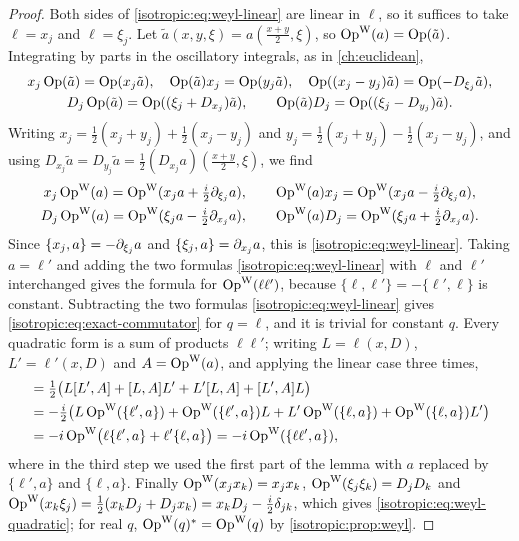 \begin{proof}
Both sides of \eqref{isotropic:eq:weyl-linear} are linear in $\ell$, so it
suffices to take $\ell=x_j$ and $\ell=\xi_j$. Let $\tilde a(x,y,\xi)=a(\frac{x+y}2,\xi)$,
so $\operatorname{Op}^{\mathrm{W}}(a)=\operatorname{Op}(\tilde a)$. Integrating by parts in the oscillatory integrals,
as in \cref{ch:euclidean},
\begin{gather*}
  x_j\operatorname{Op}(\tilde a)=\operatorname{Op}(x_j\tilde a),\quad \operatorname{Op}(\tilde a)x_j=\operatorname{Op}(y_j\tilde a),\quad
  \operatorname{Op}((x_j-y_j)\tilde a)=\operatorname{Op}(-D_{\xi_j}\tilde a),\\
  D_j\operatorname{Op}(\tilde a)=\operatorname{Op}((\xi_j+D_{x_j})\tilde a),\qquad
  \operatorname{Op}(\tilde a)D_j=\operatorname{Op}((\xi_j-D_{y_j})\tilde a).
\end{gather*}
Writing $x_j=\frac12(x_j+y_j)+\frac12(x_j-y_j)$ and
$y_j=\frac12(x_j+y_j)-\frac12(x_j-y_j)$, and using
$D_{x_j}\tilde a=D_{y_j}\tilde a=\frac12(D_{x_j}a)(\frac{x+y}2,\xi)$, we find
\begin{gather*}
  x_j\operatorname{Op}^{\mathrm{W}}(a)=\operatorname{Op}^{\mathrm{W}}(x_ja+\tfrac i2\partial_{\xi_j}a),\qquad \operatorname{Op}^{\mathrm{W}}(a)x_j=\operatorname{Op}^{\mathrm{W}}(x_ja-\tfrac i2\partial_{\xi_j}a),\\
  D_j\operatorname{Op}^{\mathrm{W}}(a)=\operatorname{Op}^{\mathrm{W}}(\xi_ja-\tfrac i2\partial_{x_j}a),\qquad \operatorname{Op}^{\mathrm{W}}(a)D_j=\operatorname{Op}^{\mathrm{W}}(\xi_ja+\tfrac i2\partial_{x_j}a).
\end{gather*}
Since $\{x_j,a\}=-\partial_{\xi_j}a$ and $\{\xi_j,a\}=\partial_{x_j}a$, this is
\eqref{isotropic:eq:weyl-linear}. Taking $a=\ell'$ and adding the two formulas
\eqref{isotropic:eq:weyl-linear} with $\ell$ and $\ell'$ interchanged gives
the formula for $\operatorname{Op}^{\mathrm{W}}(\ell\ell')$, because $\{\ell,\ell'\}=-\{\ell',\ell\}$ is
constant. Subtracting the two formulas \eqref{isotropic:eq:weyl-linear} gives
\eqref{isotropic:eq:exact-commutator} for $q=\ell$, and it is trivial for constant
$q$. Every quadratic form is a sum of products $\ell\ell'$; writing $L=\ell(x,D)$,
$L'=\ell'(x,D)$ and $A=\operatorname{Op}^{\mathrm{W}}(a)$, and applying the linear case three times,
\begin{align*}
  [\OpW(\ell\ell'),A]&=\tfrac12\bigl(L[L',A]+[L,A]L'+L'[L,A]+[L',A]L\bigr)\\
  &=-\tfrac i2\bigl(L\OpW(\{\ell',a\})+\OpW(\{\ell',a\})L+L'\OpW(\{\ell,a\})+\OpW(\{\ell,a\})L'\bigr)\\
  &=-i\OpW\bigl(\ell\{\ell',a\}+\ell'\{\ell,a\}\bigr)=-i\OpW(\{\ell\ell',a\}),
\end{align*}
where in the third step we used the first part of the lemma with $a$ replaced
by $\{\ell',a\}$ and $\{\ell,a\}$. Finally
$\operatorname{Op}^{\mathrm{W}}(x_jx_k)=x_jx_k$, $\operatorname{Op}^{\mathrm{W}}(\xi_j\xi_k)=D_jD_k$ and
$\operatorname{Op}^{\mathrm{W}}(x_k\xi_j)=\frac12(x_kD_j+D_jx_k)=x_kD_j-\frac i2\delta_{jk}$, which gives
\eqref{isotropic:eq:weyl-quadratic}; for real $q$, $\operatorname{Op}^{\mathrm{W}}(q)^*=\operatorname{Op}^{\mathrm{W}}(q)$ by
\cref{isotropic:prop:weyl}.
\end{proof}

